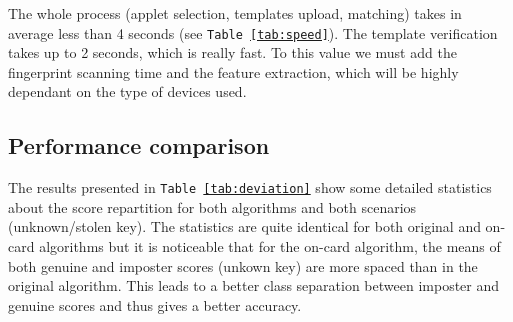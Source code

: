 \documentclass[a4paper,12pt]{article}
\begin{document}
The whole process (applet selection, templates upload, matching) takes in average less than 4 seconds (see \texttt{Table \ref{tab:speed}}). The template verification takes up to 2 seconds, which is really fast. To this value we must add the fingerprint scanning time and the feature extraction, which will be highly dependant on the type of devices used.
\begin{table}[htbp]
  \centering
    \caption{Speed measures (in milliseconds) for 8 random genuine fingerprint matching}
  \label{tab:speed}%
\end{table}%
\FloatBarrier
\newpage

\subsection{Performance comparison}
\label{std}
The results presented in \texttt{Table \ref{tab:deviation}} show some detailed statistics about the score repartition for both algorithms and both scenarios (unknown/stolen key). The statistics are quite identical for both original and on-card algorithms but it is noticeable that for the on-card algorithm, the means of both genuine and imposter scores (unkown key) are more spaced than in the original algorithm. This leads to a better class separation between imposter and genuine scores and thus gives a better accuracy.
\end{document}

